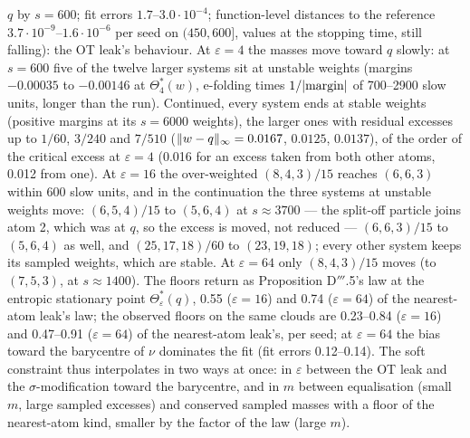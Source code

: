$q$ by $s = 600$; fit errors $1.7$--$3.0\cdot10^{-4}$; function-level distances to the reference
$3.7\cdot10^{-9}$--$1.6\cdot10^{-6}$ per seed on $(450,600]$, values at the stopping time, still falling): the OT
leak's behaviour. At $\varepsilon = 4$ the masses move toward $q$ slowly: at $s = 600$ five of the twelve larger
systems sit at unstable weights (margins $-0.00035$ to $-0.00146$ at $\Theta^*_4(w)$, e-folding times
$1/\lvert \text{margin}\rvert$ of 700--2900 slow units, longer than the run). Continued, every system ends at stable
weights (positive margins at its $s = 6000$ weights), the larger ones with residual excesses up to $1/60$, $3/240$
and $7/510$ ($\lVert w - q\rVert_\infty = 0.0167$, $0.0125$, $0.0137$), of the order of the critical excess at
$\varepsilon = 4$ (0.016 for an excess taken from both other atoms, 0.012 from one). At $\varepsilon = 16$ the
over-weighted $(8,4,3)/15$ reaches $(6,6,3)$ within 600 slow units, and in the continuation the three systems at
unstable weights move: $(6,5,4)/15$ to $(5,6,4)$ at $s\approx3700$ --- the split-off particle joins atom 2, which
was at $q$, so the excess is moved, not reduced --- $(6,6,3)/15$ to $(5,6,4)$ as well, and $(25,17,18)/60$ to
$(23,19,18)$; every other system keeps its sampled weights, which are stable. At $\varepsilon = 64$ only
$(8,4,3)/15$ moves (to $(7,5,3)$, at $s\approx1400$). The floors return as Proposition D$'''$.5's law at the
entropic stationary point $\Theta^*_\varepsilon(q)$, 0.55 ($\varepsilon = 16$) and 0.74 ($\varepsilon = 64$) of the
nearest-atom leak's law; the observed floors on the same clouds are 0.23--0.84 ($\varepsilon = 16$) and 0.47--0.91
($\varepsilon = 64$) of the nearest-atom leak's, per seed; at $\varepsilon = 64$ the bias toward the barycentre of
$\nu$ dominates the fit (fit errors 0.12--0.14). The soft constraint thus interpolates in two ways at once: in
$\varepsilon$ between the OT leak and the $\sigma$-modification toward the barycentre, and in $m$ between
equalisation (small $m$, large sampled excesses) and conserved sampled masses with a floor of the nearest-atom kind,
smaller by the factor of the law (large $m$).

